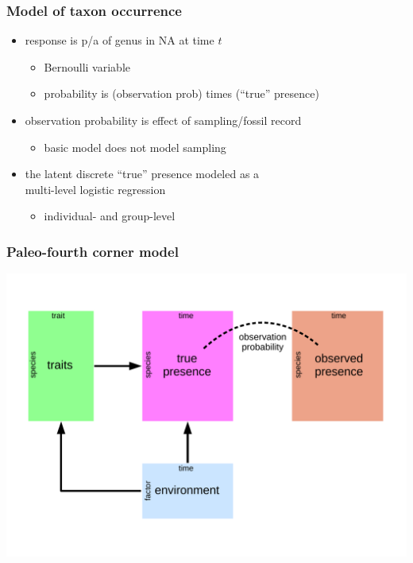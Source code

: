 \documentclass{beamer}
\begin{document}
\begin{frame}
  \frametitle{Model of taxon occurrence}
  \begin{itemize}
    \item response is p/a of genus in NA at time \(t\)
      \begin{itemize}
        \item Bernoulli variable 
        \item probability is (observation prob) times (``true'' presence)
      \end{itemize}
    \item observation probability is effect of sampling/fossil record
      \begin{itemize}
        \item basic model does not model sampling
      \end{itemize}
    \item the latent discrete ``true'' presence modeled as a \\multi-level logistic regression
      \begin{itemize}
        \item individual- and group-level
      \end{itemize}
  \end{itemize}
\end{frame}


\begin{frame}
  \frametitle{Paleo-fourth corner model}

  \begin{center}
    \includegraphics[height=0.8\textheight,width=\textwidth,keepaspectratio=true]{figure/paleo_fourth_corner}
  \end{center}
\end{frame}
\end{document}
